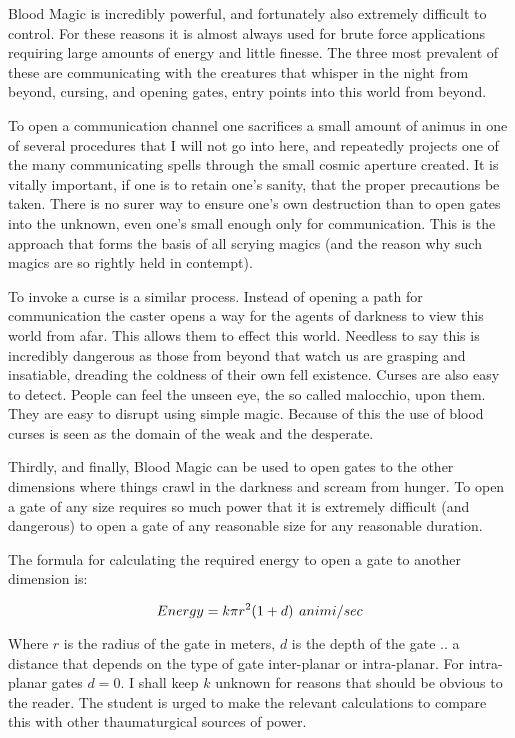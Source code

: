 \documentclass[a4paper]{article}
\begin{document}
Blood Magic is incredibly powerful, and fortunately also extremely difficult to control.  For these reasons it is almost always used for brute force applications requiring large amounts of energy and little finesse.  The three most prevalent of these are communicating with the creatures that whisper in the night from beyond, cursing, and opening gates, entry points into this world from beyond.

To open a communication channel one sacrifices a small amount of animus in one of several procedures that I will not go into here, and repeatedly projects one of the many communicating spells through the small cosmic aperture created.  It is vitally important, if one is to retain one's sanity, that the proper precautions be taken.  There is no surer way to ensure one's own destruction than to open gates into the unknown, even one's small enough only for communication.  This is the approach that forms the basis of all scrying magics (and the reason why such magics are so rightly held in contempt).

To invoke a curse is a similar process.  Instead of opening a path for communication the caster opens a way for the agents of darkness to view this world from afar.  This allows them to effect this world.  Needless to say this is incredibly dangerous as those from beyond that watch us are grasping and insatiable, dreading the coldness of their own fell existence.  Curses are also easy to detect.  People can feel the unseen eye, the so called malocchio, upon them.  They are easy to disrupt using simple magic. Because of this the use of blood curses is seen as the domain of the weak and the desperate.

Thirdly, and finally, Blood Magic can be used to open gates to the other dimensions where things crawl in the darkness and scream from hunger.  To open a gate of any size requires so much power that it is extremely difficult (and dangerous) to open a gate of any reasonable size for any reasonable duration.

The formula for calculating the required energy to open a gate to another dimension is:

\[ Energy = k \pi r^2 (1 + d) \hspace{0.4em} animi/sec \]

Where $r$ is the radius of the gate in meters, $d$ is the depth of the gate .. a 
distance that depends on the type of gate inter-planar or intra-planar.  For intra-planar gates $d = 0$.  I shall keep $k$ unknown for reasons that should be obvious to the reader.  The student is urged to make the relevant calculations to compare this with other thaumaturgical sources of power.
\end{document}
